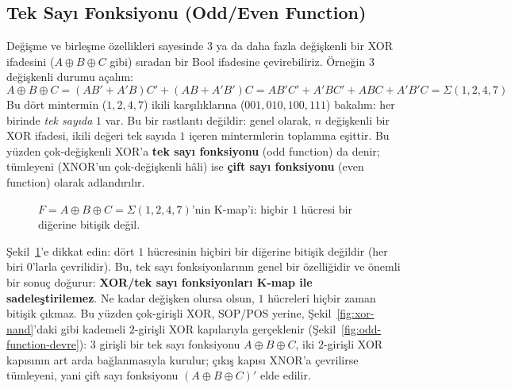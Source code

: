 \subsection{Tek Sayı Fonksiyonu (Odd/Even Function)}\label{sec:xorxnor-tek-sayi}
Değişme ve birleşme özellikleri sayesinde $3$ ya da daha fazla değişkenli bir XOR
ifadesini ($A\oplus B\oplus C$ gibi) sıradan bir Bool ifadesine çevirebiliriz. Örneğin
$3$ değişkenli durumu açalım:
\[
A\oplus B\oplus C = (AB'+A'B)C' + (AB+A'B')C = AB'C'+A'BC'+ABC+A'B'C = \Sigma(1,2,4,7)
\]
Bu dört mintermin ($1,2,4,7$) ikili karşılıklarına ($001,010,100,111$) bakalım: her
birinde \emph{tek sayıda} $1$ var. Bu bir rastlantı değildir: genel olarak, $n$
değişkenli bir XOR ifadesi, ikili değeri tek sayıda $1$ içeren mintermlerin toplamına
eşittir. Bu yüzden çok-değişkenli XOR'a \textbf{tek sayı fonksiyonu} (odd function) da
denir; tümleyeni (XNOR'un çok-değişkenli hâli) ise \textbf{çift sayı fonksiyonu} (even
function) olarak adlandırılır.

\begin{figure}[H]
\centering
{}
\caption{$F=A\oplus B\oplus C=\Sigma(1,2,4,7)$'nin K-map'i: hiçbir $1$ hücresi bir
diğerine bitişik değil.}
\label{fig:kmap-xor-3var}
\end{figure}
Şekil~\ref{fig:kmap-xor-3var}'e dikkat edin: dört $1$ hücresinin hiçbiri bir diğerine
bitişik değildir (her biri $0$'larla çevrilidir). Bu, tek sayı fonksiyonlarının genel
bir özelliğidir ve önemli bir sonuç doğurur: \textbf{XOR/tek sayı fonksiyonları K-map ile
sadeleştirilemez}. Ne kadar değişken olursa olsun, $1$ hücreleri hiçbir zaman
bitişik çıkmaz. Bu yüzden çok-girişli XOR, SOP/POS yerine, Şekil~\ref{fig:xor-nand}'daki
gibi kademeli $2$-girişli XOR kapılarıyla gerçeklenir (Şekil~\ref{fig:odd-function-devre}):
$3$ girişli bir tek sayı fonksiyonu $A\oplus B\oplus C$, iki $2$-girişli XOR kapısının
art arda bağlanmasıyla kurulur; çıkış kapısı XNOR'a çevrilirse tümleyeni, yani çift
sayı fonksiyonu $(A\oplus B\oplus C)'$ elde edilir.

